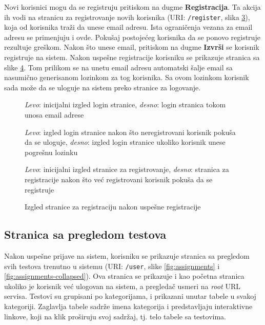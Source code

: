 Novi korisnici mogu da se registruju pritiskom na dugme \textbf{Registracija}. Ta akcija ih vodi na stranicu za registrovanje novih korisnika (URI: \texttt{/register}, slika \ref{fig:register}), koja od korisnika traži da unese email adresu. Ista ograničenja vezana za email adresu se primenjuju i ovde. Pokušaj postojećeg korisnika da se ponovo registruje rezultuje greškom. Nakon što unese email, pritiskom na dugme \textbf{Izvrši} se korisnik registruje na sistem. Nakon uspešne registracije korisniku se prikazuje stranica sa slike \ref{fig:register-success}. Tom prilikom se na unetu email adresu automatski šalje email sa nasumično generisanom lozinkom za tog korisnika. Sa ovom lozinkom korisnik sada može da se uloguje na sistem preko stranice za logovanje.
\begin{figure}[p]
\centering
{}
\caption{\textit{Levo}: inicijalni izgled login stranice, \textit{desno}: login stranica tokom unosa email adrese}
\label{fig:login}
\end{figure}
\begin{figure}[p]
\centering
{}
\caption{\textit{Levo}: izgled login stranice nakon što neregistrovani korisnik pokuša da se uloguje, \textit{desno}: izgled login stranice ukoliko korisnik unese pogrešnu lozinku}
\label{fig:login-error}
\end{figure}
\begin{figure}[p]
\centering
{}
\caption{\textit{Levo}: inicijalni izgled stranice za registrovanje, \textit{desno}: stranica za registracije nakon što već registrovani korisnik pokuša da se registruje}
\label{fig:register}
\end{figure}
\begin{figure}[ht]
\centering
{}
\caption{Izgled stranice za registraciju nakon uspešne registracije}
\label{fig:register-success}
\end{figure}

\subsection{Stranica sa pregledom testova}
Nakon uspešne prijave na sistem, korisniku se prikazuje stranica sa pregledom svih testova trenutno u sistemu (URI: \texttt{/user}, slike \ref{fig:assignments} i \ref{fig:assignments-collapsed}). Ova stranica se prikazuje i kao početna stranica ukoliko je korisnik već ulogovan na sistem, a pregledač usmeri na \textit{root} URL servisa. Testovi su grupisani po kategorijama, i prikazani unutar tabele u svakoj kategoriji. Zaglavlja tabele sadrže imena kategorija i predstavljaju interaktivne linkove, koji na klik proširuju svoj sadržaj, tj. telo tabele sa testovima.


